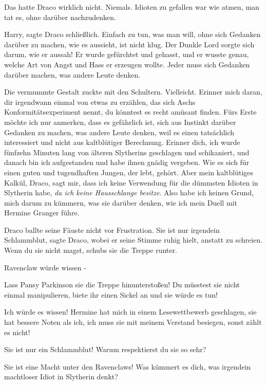 Das hatte Draco wirklich nicht. Niemals. Idioten zu gefallen war wie atmen,
man tat es, ohne darüber nachzudenken.

\glqq{}Harry\grqq{}, sagte Draco schließlich. \glqq{}Einfach zu tun, was man will,
ohne sich Gedanken darüber zu machen, wie es aussieht, ist nicht klug. Der
Dunkle Lord sorgte sich darum, wie er aussah! Er wurde gefürchtet und gehasst,
und er wusste genau, welche Art von Angst und Hass er erzeugen wollte. Jeder
muss sich Gedanken darüber machen, was andere Leute denken.\grqq{}

Die vermummte Gestalt zuckte mit den Schultern. \glqq{}Vielleicht. Erinner mich
daran, dir irgendwann einmal von etwas zu erzählen, das sich Aschs
Konformitätsexperiment nennt, du könntest es recht amüsant finden. Fürs Erste
möchte ich nur anmerken, dass es gefährlich ist, sich aus Instinkt darüber
Gedanken zu machen, was andere Leute denken, weil es einen tatsächlich
interessiert und nicht aus kaltblütiger Berechnung. Erinner dich, ich wurde
fünfzehn Minuten lang von älteren Slytherins geschlagen und schikaniert, und
danach bin ich aufgestanden und habe ihnen gnädig vergeben. Wie es sich für
einen guten und tugendhaften Jungen, der lebt, gehört. Aber mein kaltblütiges
Kalkül, Draco, sagt mir, dass ich keine Verwendung für die dümmsten Idioten in
Slytherin habe, \emph{da ich keine Hausschlange besitze}. Also habe ich keinen
Grund, mich darum zu kümmern, was sie darüber denken, wie ich mein Duell mit
Hermine Granger führe.\grqq{}

Draco ballte seine Fäuste nicht vor Frustration. \glqq{}Sie ist nur irgendein
Schlammblut\grqq{}, sagte Draco, wobei er seine Stimme ruhig hielt, anstatt zu
schreien. \glqq{}Wenn du sie nicht magst, schubs sie die Treppe runter.\grqq{}

\glqq{}Ravenclaw würde wissen -\grqq{}

\glqq{}Lass Pansy Parkinson sie die Treppe hinunterstoßen! Du müsstest sie nicht
einmal manipulieren, biete ihr einen Sickel an und sie würde es tun!\grqq{}

\glqq{}Ich würde es wissen! Hermine hat mich in einem Lesewettbewerb geschlagen,
sie hat bessere Noten als ich, ich muss sie mit meinem Verstand besiegen, sonst
zählt es nicht!\grqq{}

\glqq{}Sie ist nur ein Schlammblut! Warum respektierst du sie so sehr?\grqq{}

\glqq{}Sie ist eine Macht unter den Ravenclaws! Was kümmert es dich, was
irgendein machtloser Idiot in Slytherin denkt?\grqq{}

